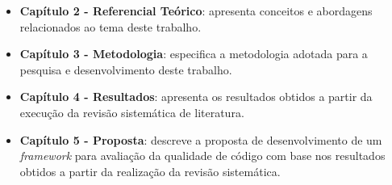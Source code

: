 \begin{itemize}
	\item \textbf{Capítulo 2 - Referencial Teórico}: apresenta conceitos e abordagens relacionados ao tema deste trabalho.

	\item \textbf{Capítulo 3 - Metodologia}: especifica a metodologia adotada para a pesquisa e desenvolvimento deste trabalho.

	\item \textbf{Capítulo 4 - Resultados}: apresenta os resultados obtidos a partir da execução da revisão sistemática de literatura.

	\item \textbf{Capítulo 5 - Proposta}: descreve a proposta de desenvolvimento de um \textit{framework} para avaliação da qualidade de código com base nos resultados obtidos a partir da realização da revisão sistemática.
\end{itemize}